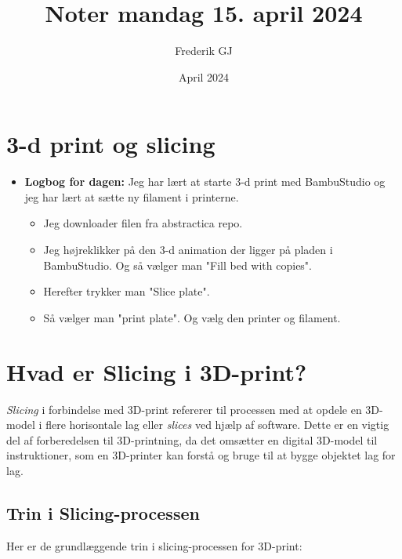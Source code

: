 \documentclass{article}
\title{Noter mandag 15. april 2024}
\author{Frederik GJ}
\date{April 2024}
\begin{document}
\maketitle

\section{3-d print og slicing}

\begin{itemize}
    \item \textbf{Logbog for dagen:} Jeg har lært at starte 3-d print med BambuStudio og jeg har lært at sætte ny filament i printerne. 
    \begin{itemize}
        \item Jeg downloader filen fra abstractica repo.
        \item Jeg højreklikker på den 3-d animation der ligger på pladen i BambuStudio. Og så vælger man "Fill bed with copies".
        \item Herefter trykker man "Slice plate".
        \item Så vælger man "print plate". Og vælg den printer og filament.
    \end{itemize}
\end{itemize}

\section{Hvad er Slicing i 3D-print?}

\textit{Slicing} i forbindelse med 3D-print refererer til processen med at opdele en 3D-model i flere horisontale lag eller \textit{slices} ved hjælp af software. Dette er en vigtig del af forberedelsen til 3D-printning, da det omsætter en digital 3D-model til instruktioner, som en 3D-printer kan forstå og bruge til at bygge objektet lag for lag.

\subsection*{Trin i Slicing-processen}

Her er de grundlæggende trin i slicing-processen for 3D-print:
\end{document}
